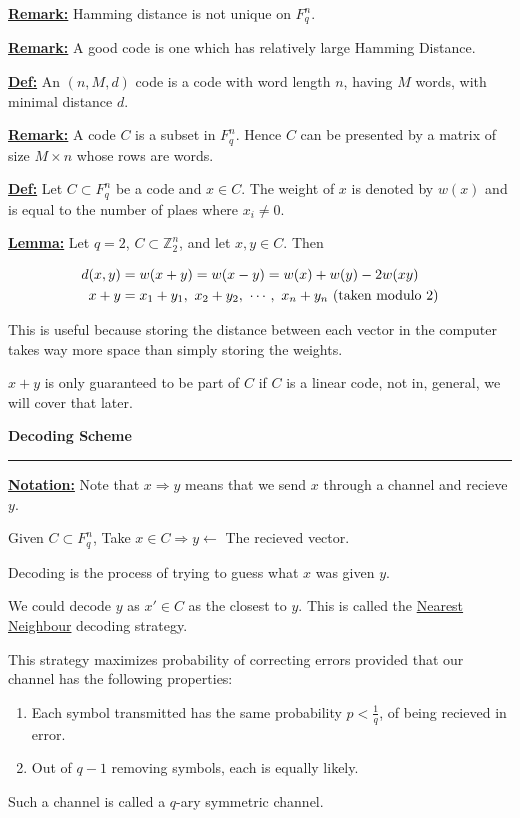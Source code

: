 \documentclass{article}
\newcommand{\header}[1]{
	\begin{Large}
	\noindent\textbf{#1}
	\vspace{2pt}
	\hrule
	\vspace{16pt}
	\end{Large}
	\normalsize
}
\renewcommand{\b}[1]{\textbf{#1}}
\newcommand{\ul}[1]{\underline{#1}}
\renewcommand{\aligned}[1]{
	\begin{align*}
		#1
	\end{align*}
}
\newcommand{\newdef}[2]{\b{\ul{#1:}} #2}
\begin{document}
\newdef{Remark}{Hamming distance is not unique on $F_q^n$.}

\newdef{Remark}{
	A good code is one which has relatively large Hamming Distance.
}

\newdef{Def}{
	An $(n, M, d)$ code is a code with word length $n$, having $M$ words,
	with minimal distance $d$.
}

\newdef{Remark}{
	A code $C$ is a subset in $F_q^n$. Hence $C$ can be presented by a
	matrix of size $M \times n$ whose rows are words.
}

\newdef{Def}{
	Let $C \subset F_q^n$ be a code and $x \in C$. The weight of $x$ is
	denoted by $w(x)$ and is equal to the number of plaes where
	$x_i \neq 0$.
}

\newdef{Lemma}{
	Let $q = 2$, $C \subset \mathbb{Z}_2^n$, and let $x, y \in C$. Then
	\aligned{
		d(x, y) & = w(x + y) = w(x - y) = w(x) + w(y) - 2w(xy) \\
		x + y   & = x_1+y_1,\ x_2 + y_2,\ \cdots,\ x_n+y_n
		\textnormal{ (taken modulo } 2)
	}
	This is useful because storing the distance between each vector in the
	computer takes way more space than simply storing the weights.

	$x + y$ is only guaranteed to be part of $C$ if $C$ is a linear code,
	not in, general, we will cover that later.
}

\header{Decoding Scheme}

\newdef{Notation}{
	Note that $x \Rightarrow y$ means that we send $x$ through a channel
	and recieve $y$.
}

Given $C \subset F_q^n$, Take $x \in C \Rightarrow y \leftarrow$ The recieved
vector.

Decoding is the process of trying to guess what $x$ was given $y$.

We could decode $y$ as $x' \in C$ as the closest to $y$. This is called the
\ul{Nearest Neighbour} decoding strategy.

This strategy maximizes probability of correcting errors provided that our
channel has the following properties:

\begin{enumerate}
	\item Each symbol transmitted has the same probability
	      $p < \frac{1}{q}$, of being recieved in error.
	\item Out of $q - 1$ removing symbols, each is equally likely.
\end{enumerate}

Such a channel is called a $q$-ary symmetric channel.
\end{document}
